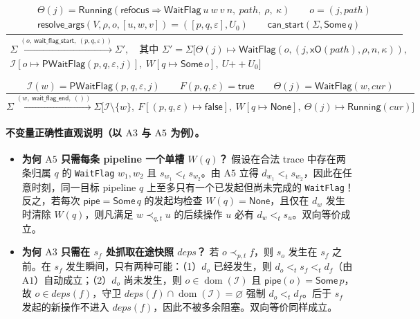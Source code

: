 \documentclass[UTF8,a4paper,11pt,fontset=fandol]{ctexart}
\newcommand{\code}[1]{\texttt{#1}}
\newcommand{\kw}[1]{\mathsf{#1}}
\newcommand{\dom}{\operatorname{dom}}
\newcommand{\pipe}{\mathsf{pipe}}
\newcommand{\step}[1]{\xrightarrow{#1}}
\begin{document}
\[
\frac{
  \begin{gathered}
    \Theta(j) = \mathsf{Running}(\mathsf{refocus} \Rightarrow \kw{WaitFlag}\ u\ w\ v\ n,\ \mathit{path},\ \rho,\ \kappa)\qquad o=(j,\mathit{path})\\
    \mathsf{resolve\_args}(V, \rho, o, [u,w,v]) = ([p,q,\varepsilon], U_0)\qquad
    \mathsf{can\_start}(\Sigma, \kw{Some}\,q)
  \end{gathered}
}{
  \begin{gathered}
    \Sigma \step{(o,\ \kw{wait\_flag\_start},\ (p,q,\varepsilon))} \Sigma', \quad\text{其中 }
    \Sigma' = \Sigma\bigl[\Theta(j)\mapsto\mathsf{WaitFlag}(o, (j, \kw{xO}(\mathit{path}), \rho, n, \kappa)),\\
    \mathcal I[o\mapsto\kw{PWaitFlag}(p,q,\varepsilon,j)],\ W[q\mapsto\kw{Some}\,o],\ U \mathrel{+\!\!+} U_0\bigr]
  \end{gathered}
}
\]

\[
\frac{
  \mathcal I(w) = \kw{PWaitFlag}(p,q,\varepsilon,j) \qquad
  F(p,q,\varepsilon) = \kw{true} \qquad
  \Theta(j) = \mathsf{WaitFlag}(w, \mathit{cur})
}{
  \Sigma \step{(w,\ \kw{wait\_flag\_end},\ ())}
  \Sigma\bigl[\mathcal I \setminus \{w\},\ F[(p,q,\varepsilon)\mapsto\kw{false}],\
              W[q\mapsto\kw{None}],\ \Theta(j)\mapsto\mathsf{Running}(\mathit{cur})\bigr]
}
\]

\paragraph{不变量正确性直观说明（以 $\mathrm{A3}$ 与 $\mathrm{A5}$ 为例）。}
\begin{itemize}
\item \textbf{为何 $\mathrm{A5}$ 只需每条 pipeline 一个单槽 $W(q)$？}
  假设在合法 trace 中存在两条归属 $q$ 的 \code{WaitFlag} $w_1, w_2$ 且 $s_{w_1} <_t s_{w_2}$。由 $\mathrm{A5}$ 立得 $d_{w_1} <_t s_{w_2}$，因此在任意时刻，同一目标 pipeline $q$ 上至多只有一个已发起但尚未完成的 \code{WaitFlag}！反之，若每次 $\pipe=\kw{Some}\,q$ 的发起均检查 $W(q)=\kw{None}$，且仅在 $d_w$ 发生时清除 $W(q)$，则凡满足 $w \prec_{q,t} u$ 的后续操作 $u$ 必有 $d_w <_t s_u$。双向等价成立。
\item \textbf{为何 $\mathrm{A3}$ 只需在 $s_f$ 处抓取在途快照 $\mathit{deps}$？}
  若 $o \prec_{p,t} f$，则 $s_o$ 发生在 $s_f$ 之前。在 $s_f$ 发生瞬间，只有两种可能：（1）$d_o$ 已经发生，则 $d_o <_t s_f <_t d_f$（由 $\mathrm{A1}$）自动成立；（2）$d_o$ 尚未发生，则 $o \in \dom(\mathcal I)$ 且 $\pipe(o)=\kw{Some}\,p$，故 $o \in \mathit{deps}(f)$，守卫 $\mathit{deps}(f) \cap \dom(\mathcal I) = \varnothing$ 强制 $d_o <_t d_f$。后于 $s_f$ 发起的新操作不进入 $\mathit{deps}(f)$，因此不被多余阻塞。双向等价同样成立。
\end{itemize}
\end{document}
